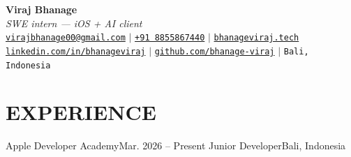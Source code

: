 


\begin{center}
    \textbf{\Huge Viraj Bhanage} \\ \vspace{4pt}
    {\small\textit{SWE intern --- iOS + AI client}} \\ \vspace{4pt}
    \small
    \faEnvelope \hspace{2pt} \href{mailto:virajbhanage00@gmail.com}{\texttt{virajbhanage00@gmail.com}} \hspace{1pt} $|$
    \hspace{1pt} \faPhone \hspace{2pt} \href{tel:+918855867440}{\texttt{+91 8855867440}} \hspace{1pt} $|$
    \hspace{1pt} \href{https://www.bhanageviraj.tech}{\texttt{bhanageviraj.tech}} \\
    \faLinkedin \hspace{2pt} \href{https://www.linkedin.com/in/bhanageviraj/}{\texttt{linkedin.com/in/bhanageviraj}} \hspace{1pt} $|$
    \hspace{1pt} \faGithub \hspace{2pt} \href{https://github.com/bhanage-viraj}{\texttt{github.com/bhanage-viraj}} \hspace{1pt} $|$
    \hspace{1pt} \faMapMarker* \hspace{2pt}\texttt{Bali, Indonesia}
\end{center}

\section{EXPERIENCE}
  \resumeSubHeadingListStart
    \resumeSubheading
      {Apple Developer Academy}{Mar. 2026 -- Present}
      {Junior Developer}{Bali, Indonesia}
      \resumeItemListStart
      \resumeItemListEnd
  \resumeSubHeadingListEnd

